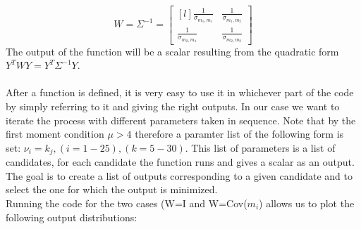 \begin{equation*}
    W=\Sigma^{-1}=
    \begin{bmatrix}[l]
        \frac{1}{\sigma_{m_1,m_1}}    &\frac{1}{\sigma_{m_1,m_2}} \\
        \frac{1}{\sigma_{m_2,m_1}}    &\frac{1}{\sigma_{m_2,m_2}}
    \end{bmatrix}
\end{equation*}
The output of the function will be a scalar resulting from the quadratic form $Y^TWY=Y^T\Sigma^{-1}Y$.
\\
\\

After a function is defined, it is very easy to use it in whichever part of the code by simply referring to it and giving the right outputs. In our case we want to iterate the process with different parameters taken in sequence. Note that by the first moment condition $\mu>4$ therefore a paramter list of the following form is set: $\nu_i=k_j, (i=1-25), (k=5-30)$. This list of parameters is a list of candidates, for each candidate the function runs and gives a scalar as an output. The goal is to create a list of outputs corresponding to a given candidate and to select the one for which the output is minimized.\\
Running the code for the two cases (W=I and W=Cov($m_i$) allows us to plot the following output distributions:

